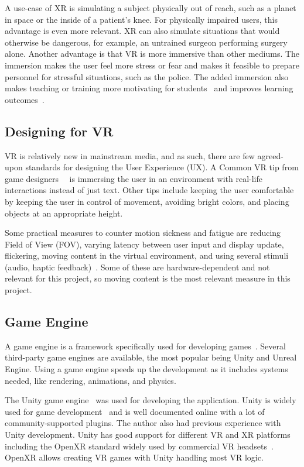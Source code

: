\documentclass[a4paper]{report}
\begin{document}
A use-case of XR is simulating a subject physically out of reach, such as a planet in space or the inside of a patient's knee. For physically impaired users, this advantage is even more relevant.
XR can also simulate situations that would otherwise be dangerous, for example, an untrained surgeon performing surgery alone.
Another advantage is that VR is more immersive than other mediums. The immersion makes the user feel more stress or fear and makes it feasible to prepare personnel for stressful situations, such as the police.
The added immersion also makes teaching or training more motivating for students~\cite{freina_immersive_2015} and improves learning outcomes~\cite{cynthia_l_foronda_virtual_nodate}.

\subsection{Designing for VR}
VR is relatively new in mainstream media, and as such, there are few agreed-upon standards for designing the User Experience (UX).
A Common VR tip from game designers~\cite{vrdesign_best_nodate}~\cite{vrdesignadobe_virtual_nodate} is immersing the user in an environment with real-life interactions instead of just text. Other tips include keeping the user comfortable by keeping the user in control of movement, avoiding bright colors, and placing objects at an appropriate height.

Some practical measures to counter motion sickness and fatigue are reducing Field of View (FOV), varying latency between user input and display update, flickering, moving content in the virtual environment, and using several stimuli (audio, haptic feedback)~\cite{chang_virtual_2020}. 
Some of these are hardware-dependent and not relevant for this project, so moving content is the most relevant measure in this project.

\subsection{Game Engine}
A game engine is a framework specifically used for developing games~\cite{gameengine_what_nodate}. Several third-party game engines are available, the most popular being Unity and Unreal Engine.
Using a game engine speeds up the development as it includes systems needed, like rendering, animations, and physics.

The Unity game engine~\cite{technologies_unity_nodate} was used for developing the application. Unity is widely used for game development~\cite{doucet_game_2021} and is well documented online with a lot of community-supported plugins. The author also had previous experience with Unity development.
Unity has good support for different VR and XR platforms~\cite{technologies_unity_nodate-3} including the OpenXR standard widely used by commercial VR headsets~\cite{noauthor_openxr_2016}. OpenXR allows creating VR games with Unity handling most VR logic.
\end{document}
